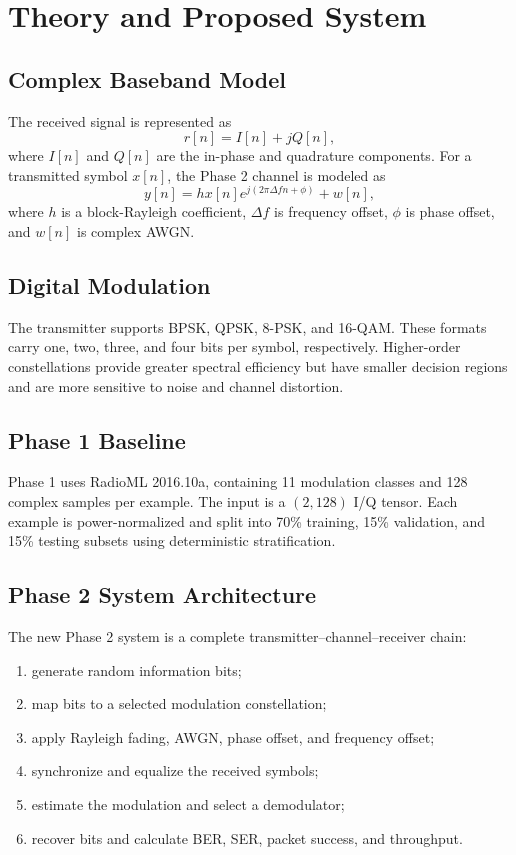 \chapter{Theory and Proposed System}

\section{Complex Baseband Model}
The received signal is represented as
\begin{equation}
r[n] = I[n] + jQ[n],
\end{equation}
where $I[n]$ and $Q[n]$ are the in-phase and quadrature components. For a
transmitted symbol $x[n]$, the Phase 2 channel is modeled as
\begin{equation}
y[n] = h x[n]e^{j(2\pi\Delta f n+\phi)} + w[n],
\end{equation}
where $h$ is a block-Rayleigh coefficient, $\Delta f$ is frequency offset,
$\phi$ is phase offset, and $w[n]$ is complex AWGN.

\section{Digital Modulation}
The transmitter supports BPSK, QPSK, 8-PSK, and 16-QAM. These formats carry
one, two, three, and four bits per symbol, respectively. Higher-order
constellations provide greater spectral efficiency but have smaller decision
regions and are more sensitive to noise and channel distortion.

\section{Phase 1 Baseline}
Phase 1 uses RadioML 2016.10a, containing 11 modulation classes and 128
complex samples per example. The input is a $(2,128)$ I/Q tensor. Each
example is power-normalized and split into 70\% training, 15\% validation,
and 15\% testing subsets using deterministic stratification.

\section{Phase 2 System Architecture}
The new Phase 2 system is a complete transmitter--channel--receiver chain:
\begin{enumerate}
\item generate random information bits;
\item map bits to a selected modulation constellation;
\item apply Rayleigh fading, AWGN, phase offset, and frequency offset;
\item synchronize and equalize the received symbols;
\item estimate the modulation and select a demodulator;
\item recover bits and calculate BER, SER, packet success, and throughput.
\end{enumerate}

